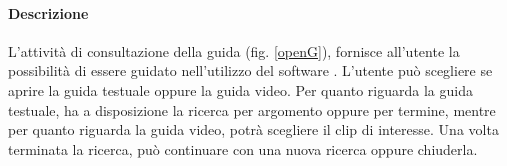 \paragraph{Descrizione\\}
L'attività di consultazione della guida (fig. \ref{openG}), fornisce all'utente la possibilità di essere guidato nell'utilizzo del software \project{}. L'utente può scegliere se aprire la guida testuale oppure la guida video. Per quanto riguarda la guida testuale, ha a disposizione la ricerca per argomento oppure per termine, mentre per quanto riguarda la guida video, potrà scegliere il clip di interesse. Una volta terminata la ricerca, può continuare con una nuova ricerca oppure chiuderla.